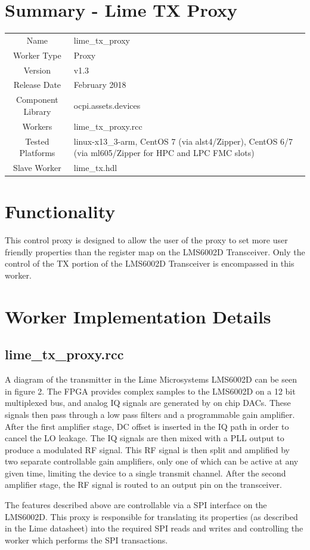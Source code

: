 \documentclass{article}
\author{} %
\date{Version \docVersion} %
\title{\docTitle}
\def\docVersion{1.3}
\def\comp{lime\_tx\_proxy}
\def\Comp{Lime TX Proxy}
\begin{document}
\section*{Summary - \Comp}
\begin{tabular}{|c|M{13.5cm}|}
	\hline
	                  &                \\
	\hline
	Name              & \comp          \\
	\hline
	Worker Type       & Proxy          \\
	\hline
	Version           & v\docVersion \\
	\hline
	Release Date      & February 2018 \\
	\hline
	Component Library & ocpi.assets.devices   \\
	\hline
	Workers           & \comp.rcc      \\
	\hline
	Tested Platforms  & linux-x13\_3-arm, CentOS 7 (via alst4/Zipper), CentOS 6/7 (via ml605/Zipper for HPC and LPC FMC slots) \\
	\hline
	Slave Worker      & lime\_tx.hdl   \\
	\hline
\end{tabular}

\section*{Functionality}
This control proxy is designed to allow the user of the proxy to set more user friendly properties than the register map on the LMS6002D Transceiver.  Only the control of the TX portion of the LMS6002D Transceiver is encompassed in this worker.

\section*{Worker Implementation Details}
\subsection*{\comp.rcc}
A diagram of the transmitter in the Lime Microsystems LMS6002D can be seen in figure 2. The FPGA provides complex samples to the LMS6002D on a 12 bit multiplexed bus, and analog IQ signals are generated by on chip DACs. These signals then pass through a low pass filters and a programmable gain amplifier. After the first amplifier stage, DC offset is inserted in the IQ path in order to cancel the LO leakage. The IQ signals are then mixed with a PLL output to produce a modulated RF signal. This RF signal is then split and amplified by two separate controllable gain amplifiers, only one of which can be active at any given time, limiting the device to a single transmit channel. After the second amplifier stage, the RF signal is routed to an output pin on the transceiver.\par\bigskip
\noindent The features described above are controllable via a SPI interface on the LMS6002D. This proxy is responsible for translating its properties (as described in the Lime datasheet) into the required SPI reads and writes and controlling the worker which performs the SPI transactions.
\newpage
\end{document}
